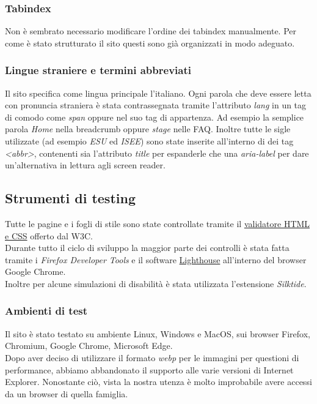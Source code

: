 \subsubsection{Tabindex}
Non è sembrato necessario modificare l'ordine dei tabindex manualmente. Per come è stato strutturato il sito questi sono già organizzati in modo adeguato.

\subsubsection{Lingue straniere e termini abbreviati}
Il sito specifica come lingua principale l'italiano. Ogni parola che deve essere letta con pronuncia straniera è stata contrassegnata tramite l'attributo \textit{lang} in un tag di comodo come \textit{span} oppure nel suo tag di appartenza. Ad esempio la semplice parola \textit{Home} nella breadcrumb oppure \textit{stage} nelle FAQ. Inoltre tutte le sigle utilizzate (ad esempio \textit{ESU} ed \textit{ISEE}) sono state inserite all'interno di dei tag \textit{<abbr>}, contenenti sia l'attributo \textit{title} per espanderle che una \textit{aria-label} per dare un'alternativa in lettura agli screen reader.

\subsection{Strumenti di testing}

Tutte le pagine e i fogli di stile sono state controllate tramite il \href{https://validator.w3.org/}{validatore HTML e CSS} offerto dal W3C.\\
Durante tutto il ciclo di sviluppo la maggior parte dei controlli è stata fatta tramite i \textit{Firefox Developer Tools} e il software \href{https://developers.google.com/web/tools/lighthouse}{Lighthouse} all'interno del browser Google Chrome.\\
Inoltre per alcune simulazioni di disabilità è stata utilizzata l'estensione \textit{Silktide}.

\subsubsection{Ambienti di test}
Il sito è stato testato su ambiente Linux, Windows e MacOS, sui browser Firefox, Chromium, Google Chrome, Microsoft Edge.\\
Dopo aver deciso di utilizzare il formato \textit{webp} per le immagini per questioni di performance, abbiamo abbandonato il supporto alle varie versioni di Internet Explorer. Nonostante ciò, vista la nostra utenza è molto improbabile avere accessi da un browser di quella famiglia.\\

